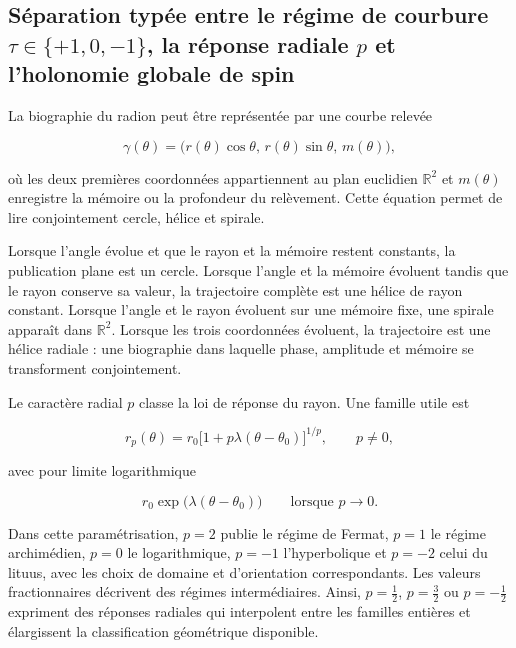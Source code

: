 \subsection{Séparation typée entre le régime de courbure \(\tau\in\{+1,0,-1\}\), la réponse radiale \(p\) et l'holonomie globale de spin}

La biographie du radion peut être représentée par une courbe relevée

\[
\gamma(\theta)
=
\bigl(r(\theta)\cos\theta,\,
r(\theta)\sin\theta,\,
m(\theta)\bigr),
\]

où les deux premières coordonnées appartiennent au plan euclidien \(\mathbb R^2\) et \(m(\theta)\) enregistre la mémoire ou la profondeur du relèvement. Cette équation permet de lire conjointement cercle, hélice et spirale.

Lorsque l'angle évolue et que le rayon et la mémoire restent constants, la publication plane est un cercle. Lorsque l'angle et la mémoire évoluent tandis que le rayon conserve sa valeur, la trajectoire complète est une hélice de rayon constant. Lorsque l'angle et le rayon évoluent sur une mémoire fixe, une spirale apparaît dans \(\mathbb R^2\). Lorsque les trois coordonnées évoluent, la trajectoire est une hélice radiale : une biographie dans laquelle phase, amplitude et mémoire se transforment conjointement.

Le caractère radial \(p\) classe la loi de réponse du rayon. Une famille utile est

\[
r_p(\theta)
=
r_0\bigl[1+p\lambda(\theta-\theta_0)\bigr]^{1/p},
\qquad p\neq 0,
\]

avec pour limite logarithmique

\[
r_0\exp\bigl(\lambda(\theta-\theta_0)\bigr)
\qquad\text{lorsque }p\to0.
\]

Dans cette paramétrisation, \(p=2\) publie le régime de Fermat, \(p=1\) le régime archimédien, \(p=0\) le logarithmique, \(p=-1\) l'hyperbolique et \(p=-2\) celui du lituus, avec les choix de domaine et d'orientation correspondants. Les valeurs fractionnaires décrivent des régimes intermédiaires. Ainsi, \(p=\tfrac12\), \(p=\tfrac32\) ou \(p=-\tfrac12\) expriment des réponses radiales qui interpolent entre les familles entières et élargissent la classification géométrique disponible.

